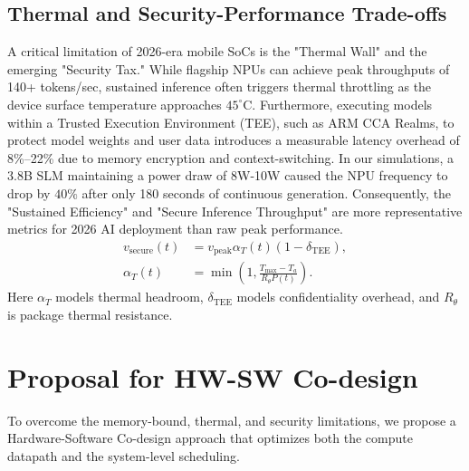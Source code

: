 \documentclass[twocolumn,10pt]{article}
\begin{document}
\subsection{Thermal and Security-Performance Trade-offs}
A critical limitation of 2026-era mobile SoCs is the "Thermal Wall" and the emerging "Security Tax." While flagship NPUs can achieve peak throughputs of 140+ tokens/sec, sustained inference often triggers thermal throttling as the device surface temperature approaches $45^\circ$C. Furthermore, executing models within a Trusted Execution Environment (TEE), such as ARM CCA Realms, to protect model weights and user data introduces a measurable latency overhead of 8\%--22\% due to memory encryption and context-switching. In our simulations, a 3.8B SLM maintaining a power draw of 8W-10W caused the NPU frequency to drop by $40\%$ after only 180 seconds of continuous generation. Consequently, the "Sustained Efficiency" and "Secure Inference Throughput" are more representative metrics for 2026 AI deployment than raw peak performance.
\begin{equation}
\begin{aligned}
v_{\mathrm{secure}}(t)
&=v_{\mathrm{peak}}\alpha_T(t)(1-\delta_{\mathrm{TEE}}),\\
\alpha_T(t)
&=\min\left(1,\frac{T_{\max}-T_a}{R_\theta P(t)}\right).
\end{aligned}
\label{eq:sustained_secure}
\end{equation}
Here $\alpha_T$ models thermal headroom, $\delta_{\mathrm{TEE}}$ models confidentiality overhead, and $R_\theta$ is package thermal resistance.

\section{Proposal for HW-SW Co-design}
To overcome the memory-bound, thermal, and security limitations, we propose a Hardware-Software Co-design approach that optimizes both the compute datapath and the system-level scheduling.
\end{document}
